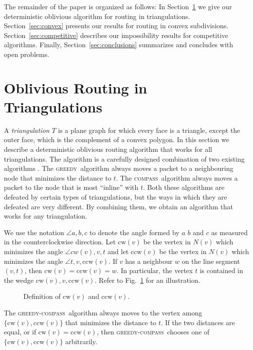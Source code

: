\documentclass{article}
\newcommand{\centeripe}[1]{\begin{center}\Ipe{#1}\end{center}}
\newcommand{\erik}[1]{#1}
\newcommand{\seclabel}[1]{\label{sec:#1}}
\newcommand{\secref}[1]{\mbox{Section~\ref{sec:#1}}}
\newcommand{\figlabel}[1]{\label{fig:#1}}
\newcommand{\figref}[1]{\mbox{Fig.~\ref{fig:#1}}}
\newcommand{\vdest}{t}
\newcommand{\cw}{\mathrm{cw}}
\newcommand{\ccw}{\mathrm{ccw}}
\newcommand{\gc}{\textsc{greedy-compass}}
\newcommand{\compass}{\textsc{compass}}
\newcommand{\greedy}{\textsc{greedy}}
\begin{document}
The remainder of the paper is organized as follows: In
\secref{triangulations} we give our deterministic oblivious
algorithm for routing in triangulations.  \secref{convex} presents our
results for routing in convex subdivisions.  \secref{competitive}
describes our impossibility results for competitive
algorithms. Finally, \secref{conclusions} summarizes and concludes
with open problems.

\section{Oblivious Routing in Triangulations}\seclabel{triangulations}

A \emph{triangulation} $T$ is a plane graph for which every face is a
triangle, except the outer face, which is the complement of a convex
polygon.  In this section we describe a deterministic oblivious
routing algorithm that works for all triangulations.  \erik{The algorithm is
a carefully designed combination of two existing algorithms
\cite{bm99a}.  The \greedy\ algorithm always moves a packet to a
neighbouring node that minimizes the distance to $\vdest$.  The
\compass\ algorithm always moves a packet to the node that is most
``inline'' with $\vdest$.  Both these algorithms are defeated by
certain types of triangulations, but the ways in which they are
defeated are very different.  By combining them, we obtain an algorithm
that works for any triangulation.
}

We use the notation $\angle a,b,c$ to denote the angle formed by $a$
$b$ and $c$ as measured in the counterclockwise direction.  Let
$\cw(v)$ be the vertex in $N(v)$ which minimizes the angle $\angle
cw(v),v,\vdest$ and let $\ccw(v)$ be the vertex in $N(v)$ which
minimizes the angle $\angle\vdest,v,\ccw(v)$.  If $v$ has a neighbour
$w$ on the line segment $(v,\vdest)$, then $\cw(v)=\ccw(v)=w$.  In
particular, the vertex $t$ is contained in the wedge
$\cw(v),v,\ccw(v)$.  Refer to \figref{cw-ccw} for an illustration.

\begin{figure}
\centeripe{cw-ccw.ipe}
\caption{Definition of $\cw(v)$ and $\ccw(v)$.}
\figlabel{cw-ccw}
\end{figure}

The \gc\ algorithm always moves to the vertex among
$\{\cw(v),\ccw(v)\}$ that minimizes the distance to $\vdest$.  If the
two distances are equal, or if $\cw(v)=\ccw(v)$, then \gc\ chooses one of
$\{\cw(v),\ccw(v)\}$ arbitrarily.
\end{document}
